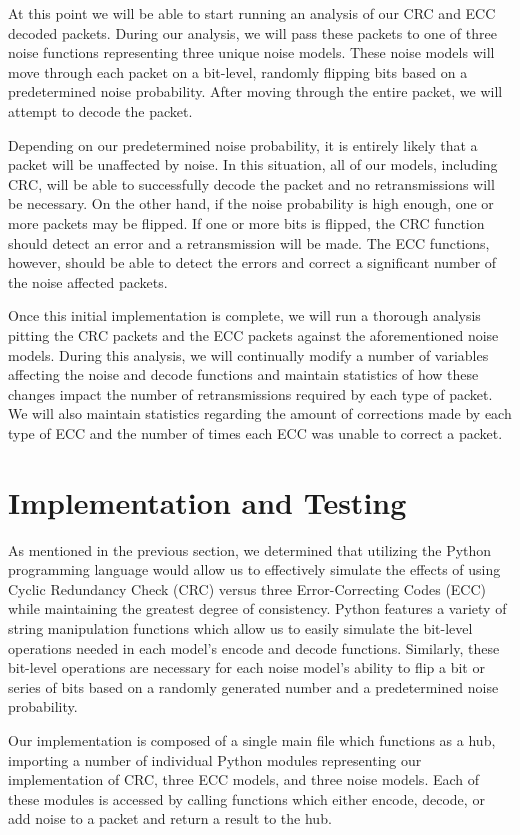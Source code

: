 \documentclass{sigcomm-alternate}
\begin{document}
At this point we will be able to start running an analysis of our CRC and ECC decoded packets. During our analysis, we will pass these packets to one of three noise functions representing three unique noise
models. These noise models will move through each packet on a bit-level, randomly flipping bits based on a predetermined noise probability. After moving through the entire packet, we will attempt to decode the packet. 

Depending on our predetermined noise probability, it is entirely likely that a packet will be unaffected by noise. In this situation, all of our models, including CRC, will be able to successfully decode the packet and no retransmissions will be necessary. On the other hand, if the noise probability is high enough, one or more packets may be flipped. If one or more bits is flipped, the CRC function should detect an error and a retransmission will be made. The ECC functions, however, should be able to detect the errors and correct a significant number of the noise affected packets.

Once this initial implementation is complete, we will run a thorough analysis pitting the CRC packets and the ECC packets against the aforementioned noise models. During this analysis, we will continually modify a number of variables affecting the noise and decode functions and maintain statistics of how these changes impact the number of retransmissions required by each type of packet. We will also maintain statistics regarding the amount of corrections made by each type of ECC and the number of times each ECC was unable to correct a packet.

\section{Implementation and Testing}
As mentioned in the previous section, we determined that utilizing the Python programming language would allow us to effectively simulate the effects of using Cyclic Redundancy Check (CRC) versus three Error-Correcting Codes (ECC) while maintaining the greatest degree of consistency. Python features a variety of string manipulation functions which allow us to easily simulate the bit-level operations needed in each model's encode and decode functions. Similarly, these bit-level operations are necessary for each noise model's ability to flip a bit or series of bits based on a randomly generated number and a predetermined noise probability.

Our implementation is composed of a single main file which functions as a hub, importing a number of individual Python modules representing our implementation of CRC, three ECC models, and three noise models. Each of these modules is accessed by calling functions which either encode, decode, or add noise to a packet and return a result to the hub.
\end{document}
